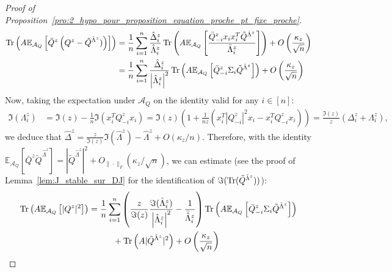 \documentclass[a4papaer, titlepage]{book}
\begin{document}
\begin{proof}[Proof of Proposition~\ref{pro:2_hypo_pour_proposition_equation_proche_pt_fixe_proche}]
    \begin{align*}
    \operatorname{Tr} \left(A \mathbb E_{\mathcal A_Q} \left[\bar Q^z\left(Q^z - \tilde Q^{\hat\Lambda^z})\right)\right]\right)
    &=\frac{1}{n}\sum_{i=1}^n  \frac{\hat \Delta_i^z}{\hat \Lambda_i^z}\operatorname{Tr} \left(A \mathbb E_{\mathcal A_Q} \left[\frac{\bar Q^z_{-i} x_i x_i^T \tilde Q^{\hat\Lambda^z} }{\bar \Lambda^z_i}\right]\right)+ O \left(\frac{\kappa_z}{\sqrt{n}}\right)\\
    &=\frac{1}{n}\sum_{i=1}^n  \frac{\hat \Delta_i^z}{\left\vert \hat \Lambda_i^z\right\vert^2}\operatorname{Tr} \left(A \mathbb E_{\mathcal A_Q} \left[\bar Q^z_{-i} \Sigma_i \tilde Q^{\hat\Lambda^z} \right]\right)+ O \left(\frac{\kappa_z}{\sqrt{n}}\right)
  \end{align*} 
  Now, taking the expectation under $\mathcal A_Q$ on the identity valid for any $i\in[n]$:
  \begin{align}\label{eq:relation_Lambda_Delta}
      \Im(\Lambda^z_i) 
      &= \Im(z) -\frac{1}{n}\Im(x_i^TQ^z_{-i}x_i)
      = \Im(z)\left(1+\frac{1}{n  z}\left(x_i^T|Q^z_{-i}|^2x_i - x_i^T  Q^z_{-i}x_i\right)\right) 
      = \frac{\Im(z)}{ z} \left( \Delta_i^z +\Lambda^z_i\right),
    \end{align}
    we deduce that $\hat \Delta^z =  \frac{z}{\Im(z)} \Im(\hat \Lambda^z) - \hat \Lambda^z + O(\kappa_z/n)$. Therefore, with the identity $\mathbb E_{\mathcal A_Q}[\bar Q^z \tilde Q^{\hat \Lambda^z}] = |\tilde Q^{\hat\Lambda^z}|^2 + O_{\|\cdot \|_F}(\kappa_z/\sqrt n)$, we can estimate (see the proof of Lemma~\ref{lem:J_stable_sur_DJ} for the identification of $\Im(\operatorname{Tr}(\tilde Q^{\hat \lambda^z}))$):
    \begin{align*}
    \tr \left(A \mathbb E_{\mathcal A_Q} \left[|Q^z|^2\right]\right)
    &=\frac{1}{n}\sum_{i=1}^n  \left(\frac{z}{\Im(z)}\frac{\Im(\hat \Lambda_i^z)}{\left\vert \hat \Lambda_i^z\right\vert^2}  - \frac{1}{ \bar{\hat \Lambda}_i^z}\right)\tr \left(A \mathbb E_{\mathcal A_Q} \left[\bar Q^z_{-i} \Sigma_i \tilde Q^{\hat\Lambda^z} \right]\right)\\
    &\hspace{1cm}+ \tr \left(A |\tilde Q^{\hat\Lambda^z}|^2 \right)+ O \left(\frac{\kappa_z}{\sqrt{n}}\right) \\%

\end{align*}
\end{proof}
\end{document}
